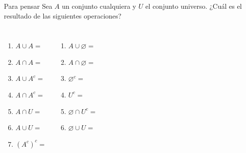 \documentclass[aspectratio=169]{beamer}
\begin{document}
\begin{frame}[t]{Para pensar}
\large
Sea $A$ un conjunto cualquiera y $U$ el conjunto universo. ¿Cuál es el resultado de las siguientes operaciones?

\begin{columns}[onlytextwidth]
\begin{enumerate}
    \item $A\cup A =$
    \item $A\cap A =$
    \item $A\cup A^c =$
    \item $A\cap A^c =$
    \item $ A\cap U = $
    \item $A \cup U =$
    \item $(A^c)^c =$
\end{enumerate}

   \begin{enumerate}
    \item $A\cup \varnothing =$
    \item $A\cap \varnothing = $
    \item $\varnothing^c =$
    \item $U^c =$
    \item $ \varnothing\cap U^c =$
    \item $\varnothing\cup U =$
\end{enumerate} 
\end{columns}
\end{frame}
\end{document}
